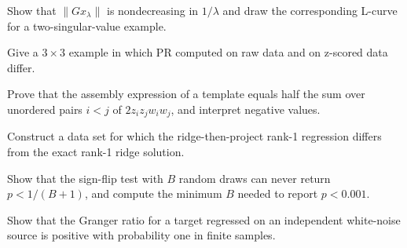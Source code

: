 \begin{exercises}
\item Show that $\|Gx_\lambda\|$ is nondecreasing in $1/\lambda$ and draw the corresponding L-curve for a two-singular-value example.
\item Give a $3\times3$ example in which PR computed on raw data and on z-scored data differ.
\item Prove that the assembly expression of a template equals half the sum over unordered pairs $i<j$ of $2z_iz_jw_iw_j$, and interpret negative values.
\item Construct a data set for which the ridge-then-project rank-1 regression differs from the exact rank-1 ridge solution.
\item Show that the sign-flip test with $B$ random draws can never return $p<1/(B+1)$, and compute the minimum $B$ needed to report $p<0.001$.
\item Show that the Granger ratio for a target regressed on an independent white-noise source is positive with probability one in finite samples.
\end{exercises}
